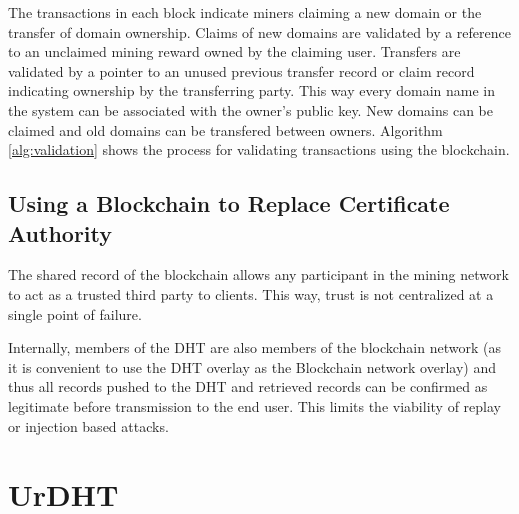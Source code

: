 The transactions in each block indicate miners claiming a new domain or the transfer of domain ownership. Claims of new domains are validated by a reference to an unclaimed mining reward owned by the claiming user. Transfers are validated by a pointer to an unused previous transfer record or claim record indicating ownership by the transferring party. This way every domain name in the system can be associated with the owner's public key. New domains can be claimed and old domains can be transfered between owners.
Algorithm \ref{alg:validation} shows the process for validating transactions using the blockchain.







\subsection{Using a Blockchain to Replace Certificate Authority}
The shared record of the blockchain allows any participant in the mining network to act as a trusted third party to clients. This way, trust is not centralized at a single point of failure. 

Internally, members of the DHT are also members of the blockchain network (as it is convenient to use the DHT overlay as the Blockchain network overlay) and thus all records pushed to the DHT and retrieved records can be confirmed as legitimate before transmission to the end user. This limits the viability of replay or injection based attacks.




\section{UrDHT}

